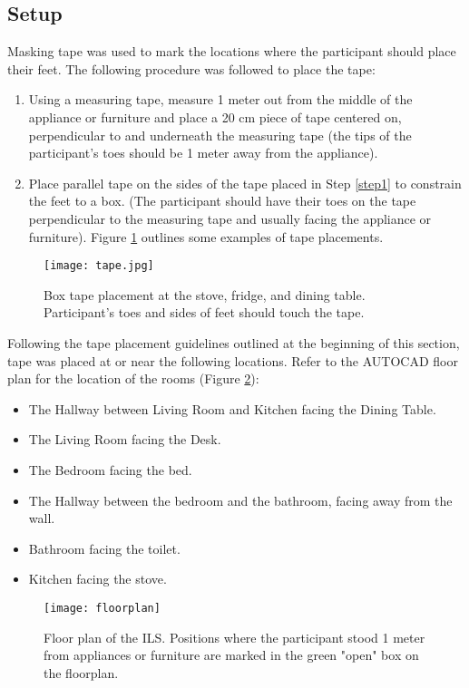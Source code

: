 \subsection{Setup}
Masking tape was used to mark the locations where the participant should place their feet.
The following procedure was followed to place the tape:
\begin{enumerate}
    \item Using a measuring tape, measure 1 meter out from the middle of the 
    appliance or furniture and place a 20 cm piece of tape centered on, perpendicular to
    and underneath the measuring tape (the tips of the participant's toes should be 1 meter
    away from the appliance).\label{step1}
    \item Place parallel tape on the sides of the tape placed in Step \ref{step1} to constrain
    the feet to a box. (The participant should have their toes on the tape perpendicular to the
    measuring tape and usually facing the appliance or furniture).
    Figure \ref{fig:tape} outlines some examples of tape placements.
\end{enumerate}


\begin{figure}[ht]
    \centering
    \texttt{[image: tape.jpg]}
    \caption{Box tape placement at the stove, fridge, and dining table. Participant's toes 
    and sides of feet should touch the tape.}
    \label{fig:tape}
\end{figure}

Following the tape placement guidelines outlined at the beginning of this section,
tape was placed at or near the following locations. Refer to the AUTOCAD floor plan for 
the location of the rooms (Figure \ref{fig:floorplan}):
\begin{itemize}
    \item The Hallway between Living Room and Kitchen facing the Dining Table.
    \item The Living Room facing the Desk.
    \item The Bedroom facing the bed.
    \item The Hallway between the bedroom and the bathroom, facing away from the wall.
    \item Bathroom facing the toilet.
    \item Kitchen facing the stove.
\end{itemize}

\begin{figure}[ht]
    \centering
    \texttt{[image: floorplan]}
    \caption{Floor plan of the ILS. Positions where the participant stood 1 meter
    from appliances or furniture are marked in the green "open" box on the floorplan.
    }
    \label{fig:floorplan}
\end{figure}

